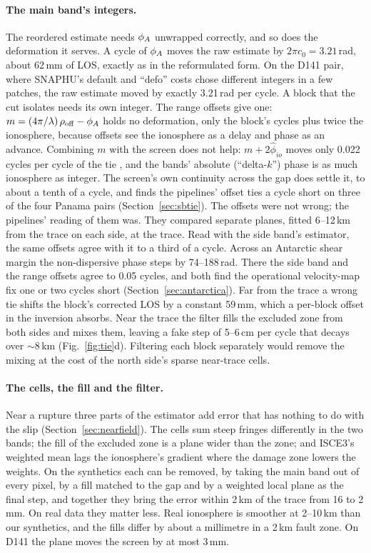 \paragraph{The main band's integers.} The reordered estimate needs $\phi_A$ unwrapped correctly, and so does the
deformation it serves. A cycle of $\phi_A$ moves the raw estimate by $2\pi c_0 = 3.21$\,rad, about 62\,mm of LOS,
exactly as in the reformulated form. On the D141 pair, where SNAPHU's default and ``defo'' costs chose different
integers in a few patches, the raw estimate moved by exactly 3.21\,rad per cycle. A block that the cut isolates needs
its own integer. The range offsets give one: $m = (4\pi/\lambda)\,\rho_\mathrm{off} - \phi_A$ holds no deformation, only
the block's cycles plus twice the ionosphere, because offsets see the ionosphere as a delay and phase as an advance.
Combining $m$ with the screen does not help: $m + 2\hat\phi_{io}$ moves only 0.022 cycles per cycle of the tie
\citep[Sec.~III-D makes the same point about phase--group-delay differences]{gomba2016toward}, and the bands' absolute
(``delta-$k$'') phase \citep{bovenga2013mca} is as much ionosphere as integer. The screen's own continuity across the
gap does settle it, to about a tenth of a cycle, and finds the pipelines' offset ties a cycle short on three of the
four Panama pairs (Section~\ref{sec:sbtie}). The offsets were not wrong; the pipelines' reading of them was. They
compared separate planes, fitted 6--12\,km from the trace on each side, at the trace. Read with the side band's
estimator, the same offsets agree with it to a third of a cycle. Across an Antarctic shear margin the non-dispersive phase steps by 74--188\,rad. There
the side band and the range offsets agree to 0.05 cycles, and both find the operational velocity-map fix one or two
cycles short (Section~\ref{sec:antarctica}). Far from the trace a wrong tie shifts the block's corrected LOS by a constant
59\,mm, which a per-block offset in the inversion absorbs. Near the trace the filter fills the excluded zone from both
sides and mixes them, leaving a fake step of 5--6\,cm per cycle that decays over $\sim$8\,km
(Fig.~\ref{fig:tie}d). Filtering each block separately would remove the mixing at the cost of the north side's sparse
near-trace cells.

\paragraph{The cells, the fill and the filter.} Near a rupture three parts of the estimator add error that has nothing
to do with the slip (Section~\ref{sec:nearfield}). The cells sum steep fringes differently in the two bands; the fill
of the excluded zone is a plane wider than the zone; and ISCE3's weighted mean lags the ionosphere's gradient where
the damage zone lowers the weights. On the synthetics each can be removed, by taking the main band out of every pixel,
by a fill matched to the gap and by a weighted local plane as the final step, and together they bring the error within
2\,km of the trace from 16 to 2\,mm. On real data they matter less. Real ionosphere is smoother at 2--10\,km than our
synthetics, and the fills differ by about a millimetre in a 2\,km fault zone. On D141 the plane moves the screen by at
most 3\,mm.

